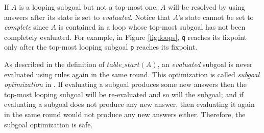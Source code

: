 \documentclass{tlp}
\begin{document}
If $A$ is a looping subgoal but not a top-most one, $A$ will be resolved by using answers after its state is set to {\it evaluated}. Notice that $A$'s state cannot be set to {\it complete} since $A$ is contained in a loop whose top-most subgoal has not been completely evaluated. For example, in Figure \ref{fig:loops}, {\tt q} reaches its fixpoint only after the top-most looping subgoal {\tt p} reaches its fixpoint. 

As described in the definition of $table\_start(A)$, an {\it evaluated} subgoal is never evaluated using rules again in the same round. This optimization is called {\it subgoal optimization} in \cite{Zhou03}. If evaluating a  subgoal produces some new answers then the top-most looping subgoal will be re-evaluated and so will the subgoal; and if evaluating a subgoal does not produce any new answer, then evaluating it again in the same round would not produce any new answers either. Therefore, the subgoal optimization is safe.
\end{document}
